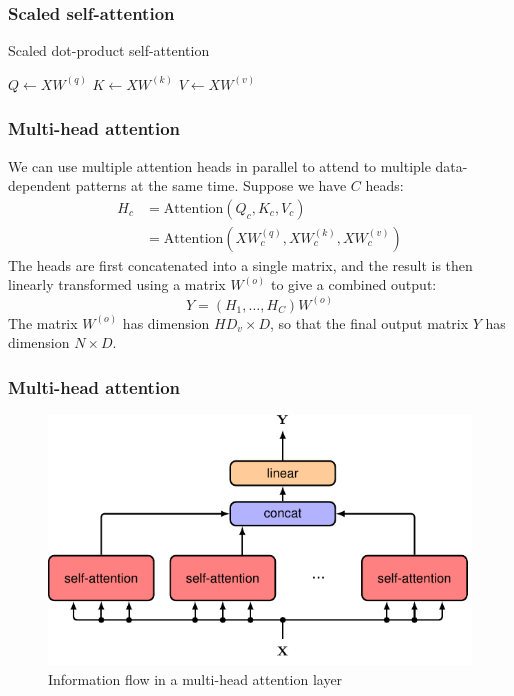 \documentclass{beamer}
\begin{document}
\begin{frame}
    \frametitle{Scaled self-attention}
    \begin{algorithm}[H]
        \caption{Scaled dot-product self-attention}
        $Q\gets{}XW^{(q)}$\;
        $K\gets{}XW^{(k)}$\;
        $V\gets{}XW^{(v)}$\;
        \;
    \end{algorithm}
\end{frame}

\begin{frame}
    \frametitle{Multi-head attention}
    We can use multiple attention heads in parallel to attend to multiple data-dependent patterns at the same time. Suppose we have $C$ heads:
    \begin{align*}
        H_{c}&=\mathrm{Attention}(Q_{c},K_{c},V_{c}) \\
        &=\mathrm{Attention}(XW^{(q)}_{c},XW^{(k)}_{c},XW^{(v)}_{c})
    \end{align*}
    The heads are first concatenated into a single matrix, and the result is then linearly transformed using a matrix $W^{(o)}$ to give a combined output:
    \begin{equation*}
        Y=(H_{1},\hdots,H_{C})W^{(o)}
    \end{equation*}
    The matrix $W^{(o)}$ has dimension $HD_{v}\times{}D$, so that the final output matrix $Y$ has dimension $N\times{}D$.
\end{frame}

\begin{frame}
    \frametitle{Multi-head attention}
    \begin{figure}
        \caption{Information flow in a multi-head attention layer}
        \includegraphics[height=0.7\textheight]{Figure_8.pdf}
    \end{figure}
\end{frame}
\end{document}
